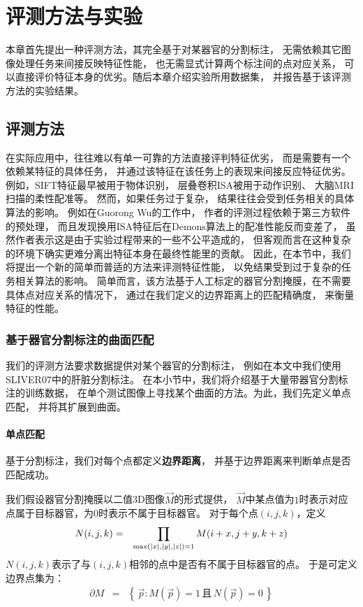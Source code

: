 
\chapter{评测方法与实验\label{chap:expr}}
本章首先提出一种评测方法，其完全基于对某器官的分割标注，
无需依赖其它图像处理任务来间接反映特征性能，
也无需显式计算两个标注间的点对应关系，
可以直接评价特征本身的优劣。随后本章介绍实验所用数据集，
并报告基于该评测方法的实验结果。

\section{评测方法}
在实际应用中，往往难以有单一可靠的方法直接评判特征优劣，
而是需要有一个依赖某特征的具体任务，
并通过该特征在该任务上的表现来间接反应特征优劣。
例如，SIFT特征最早被用于物体识别\cite{lowe1999object}，
层叠卷积ISA被用于动作识别\cite{le2011learning}、
大脑MRI扫描的柔性配准\cite{wu2013unsupervised}等。
然而，如果任务过于复杂，
结果往往会受到任务相关的具体算法的影响。
例如在Guorong Wu的工作\cite{wu2013unsupervised}中，
作者的评测过程依赖于第三方软件的预处理，
而且发现换用ISA特征后在Demons算法上的配准性能反而变差了，
虽然作者表示这是由于实验过程带来的一些不公平造成的，
但客观而言在这种复杂的环境下确实更难分离出特征本身在最终性能里的贡献。
因此，在本节中，我们将提出一个新的简单而普适的方法来评测特征性能，
以免结果受到过于复杂的任务相关算法的影响。
简单而言，该方法基于人工标定的器官分割掩膜，在不需要具体点对应关系的情况下，
通过在我们定义的边界距离上的匹配精确度，
来衡量特征的性能。

\subsection{基于器官分割标注的曲面匹配}
我们的评测方法要求数据提供对某个器官的分割标注，
例如在本文中我们使用SLIVER07中的肝脏分割标注。
在本小节中，我们将介绍基于大量带器官分割标注的训练数据，
在单个测试图像上寻找某个曲面的方法。为此，我们先定义单点匹配，
并将其扩展到曲面。

\subsubsection{单点匹配}
基于分割标注，我们对每个点都定义{\bf 边界距离}，
并基于边界距离来判断单点是否匹配成功。

我们假设器官分割掩膜以二值3D图像$\vec{M}$的形式提供，
$\vec{M}$中某点值为$1$时表示对应点属于目标器官，为$0$时表示不属于目标器官。
对于每个点$(i, j, k)$，定义
\begin{eqnarray}
    N(i, j, k) &=& \prod_{
        \max(\left|x\right|, \left|y\right|, \left|z\right|) = 1}
        M(i + x, j + y, k + z)
\end{eqnarray}
$N(i, j, k)$表示了与$(i, j, k)$相邻的点中是否有不属于目标器官的点。
于是可定义边界点集为：
\begin{eqnarray}
    \partial M &=& \left\{\,\vec{p} : M(\vec{p}) = 1\,\text{且}\,
        N(\vec{p}) = 0\,\right\}
\end{eqnarray}

